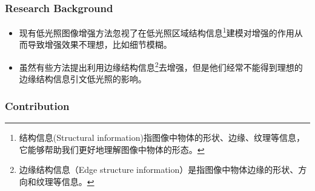 \documentclass[letterpaper,10pt]{article}
\begin{document}
			\subsubsection{Research Background}
			
			\begin{itemize}
				\item [(1)]
				现有低光照图像增强方法忽视了在低光照区域结构信息\footnote{结构信息(Structural information)指图像中物体的形状、边缘、纹理等信息，它能够帮助我们更好地理解图像中物体的形态。}建模对增强的作用从而导致增强效果不理想，比如细节模糊。
				\item [(2)]
				虽然有些方法提出利用边缘结构信息\footnote{边缘结构信息（Edge structure information）是指图像中物体边缘的形状、方向和纹理等信息。}去增强，但是他们经常不能得到理想的边缘结构信息引文低光照的影响。
			\end{itemize}
			
			\subsubsection{Contribution}
			
\end{document}
